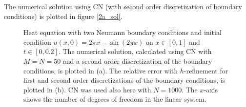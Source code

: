 The numerical solution using CN (with second order discretization of boundary conditions) is plotted in figure \ref{2a_sol}.

\begin{figure}
\centering
{}\hspace{0mm}
\hspace{0mm}
\caption{Heat equation with two Neumann boundary conditions and initial condition $u(x,0) = 2\pi x - \sin{(2\pi x)}$ on $x \in [0,1]$ and $t \in [0,0.2]$. The numerical solution, calculated using CN with $M=N=50$ and a second order discretization of the boundary conditions, is plotted in (a). The relative error with $h$-refinement for first and second order discretizations of the boundary conditions, is plotted in (b). CN was used also here with $N=1000$. The $x$-axis shows the number of degrees of freedom in the linear system.}
\end{figure}

